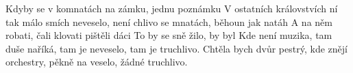 \begin{TEXT}{Kdyby se v komnatách}
\SLOKA {} na zámku,   jednu poznámku\NL
    \NL
   V ostatních královstvích ní tak málo smích\NL
    neveselo, není chlivo
\REFREN {} se mnatách, běhoun jak  natáh\NL
   A na něm robati, čali klovati\NL
     pištěli dáci\NL
   To by se sně žilo,  by byl 
\SLOKA Kde není muzika, tam duše naříká,\NL
   tam je neveselo, tam je truchlivo.\NL
   Chtěla bych dvůr pestrý, kde znějí orchestry,\NL
   pěkně na veselo, žádné truchlivo.
\REFRENHRAJ
\end{TEXT}
